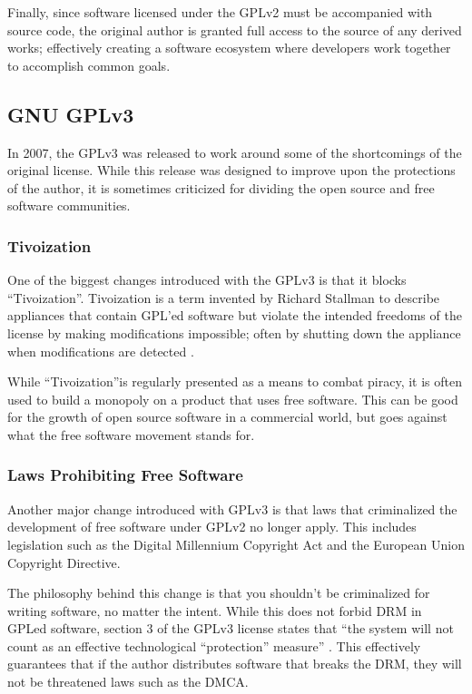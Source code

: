 \documentclass[12pt,letterpaper]{article}
\begin{document}
Finally, since software licensed under the GPLv2 must be accompanied with source code, the original author is granted full access to the source of any derived works; effectively creating a software ecosystem where developers work together to accomplish common goals.

\subsection{GNU GPLv3}

In 2007, the GPLv3 was released to work around some of the shortcomings of the original license. While this release was designed to improve upon the protections of the author, it is sometimes criticized for dividing the open source and free software communities.

\subsubsection{Tivoization}
One of the biggest changes introduced with the GPLv3 is that it blocks ``Tivoization''. Tivoization is a term invented by Richard Stallman to describe appliances that contain GPL'ed software but violate the intended freedoms of the license by making modifications impossible; often by shutting down the appliance when modifications are detected \cite{gpl3}.

While ``Tivoization''is regularly presented as a means to combat piracy, it is often used to build a monopoly on a product that uses free software. This can be good for the growth of open source software in a commercial world, but goes against what the free software movement stands for.

\subsubsection{Laws Prohibiting Free Software}

Another major change introduced with GPLv3 is that laws that criminalized the development of free software under GPLv2 no longer apply. This includes legislation such as the Digital Millennium Copyright Act and the European Union Copyright Directive.

The philosophy behind this change is that you shouldn't be criminalized for writing software, no matter the intent. While this does not forbid DRM in GPLed software, section 3 of the GPLv3 license states that ``the system will not count as an effective technological ``protection'' measure'' \cite{gpl3}. This effectively guarantees that if the author distributes software that breaks the DRM, they will not be threatened laws such as the DMCA.
\end{document}
